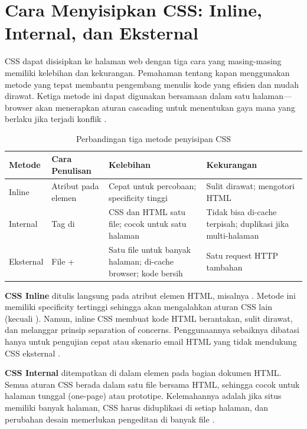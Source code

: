 \section{Cara Menyisipkan CSS: Inline, Internal, dan Eksternal}

CSS dapat disisipkan ke halaman web dengan tiga cara yang masing-masing memiliki kelebihan dan kekurangan. Pemahaman tentang kapan menggunakan metode yang tepat membantu pengembang menulis kode yang efisien dan mudah dirawat. Ketiga metode ini dapat digunakan bersamaan dalam satu halaman---browser akan menerapkan aturan cascading untuk menentukan gaya mana yang berlaku jika terjadi konflik \cite{mdnCss}.

\begin{table}[htbp]
\centering
\begin{tabular}{|P{2cm}|P{3cm}|P{3.5cm}|P{3.5cm}|}
\hline
\textbf{Metode} & \textbf{Cara Penulisan} & \textbf{Kelebihan} & \textbf{Kekurangan} \\
\hline
Inline & Atribut  pada elemen & Cepat untuk percobaan; specificity tinggi & Sulit dirawat; mengotori HTML \\
\hline
Internal & Tag  di  & CSS dan HTML satu file; cocok untuk satu halaman & Tidak bisa di-cache terpisah; duplikasi jika multi-halaman \\
\hline
Eksternal & File  +  & Satu file untuk banyak halaman; di-cache browser; kode bersih & Satu request HTTP tambahan \\
\hline
\end{tabular}
\caption{Perbandingan tiga metode penyisipan CSS}
\end{table}

\textbf{CSS Inline} ditulis langsung pada atribut  elemen HTML, misalnya . Metode ini memiliki specificity tertinggi sehingga akan mengalahkan aturan CSS lain (kecuali ). Namun, inline CSS membuat kode HTML berantakan, sulit dirawat, dan melanggar prinsip separation of concerns. Penggunaannya sebaiknya dibatasi hanya untuk pengujian cepat atau skenario email HTML yang tidak mendukung CSS eksternal \cite{webdevCss}.

\textbf{CSS Internal} ditempatkan di dalam elemen  pada bagian  dokumen HTML. Semua aturan CSS berada dalam satu file bersama HTML, sehingga cocok untuk halaman tunggal (one-page) atau prototipe. Kelemahannya adalah jika situs memiliki banyak halaman, CSS harus diduplikasi di setiap halaman, dan perubahan desain memerlukan pengeditan di banyak file \cite{mdnCss}.

